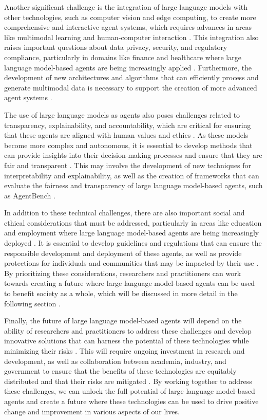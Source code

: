 \documentclass[11pt,a4paper]{article}
\begin{document}
Another significant challenge is the integration of large language models with other technologies, such as computer vision and edge computing, to create more comprehensive and interactive agent systems, which requires advances in areas like multimodal learning and human-computer interaction \cite{doi:10.1109/mwc.005.2400019}. This integration also raises important questions about data privacy, security, and regulatory compliance, particularly in domains like finance and healthcare where large language model-based agents are being increasingly applied \cite{arxiv:2408.06361}. Furthermore, the development of new architectures and algorithms that can efficiently process and generate multimodal data is necessary to support the creation of more advanced agent systems \cite{arxiv:2401.13601}.

The use of large language models as agents also poses challenges related to transparency, explainability, and accountability, which are critical for ensuring that these agents are aligned with human values and ethics \cite{doi:10.1145/3748302}. As these models become more complex and autonomous, it is essential to develop methods that can provide insights into their decision-making processes and ensure that they are fair and transparent \cite{doi:10.18653/v1/2023.acl-long.411}. This may involve the development of new techniques for interpretability and explainability, as well as the creation of frameworks that can evaluate the fairness and transparency of large language model-based agents, such as AgentBench \cite{arxiv:2308.03688}.

In addition to these technical challenges, there are also important social and ethical considerations that must be addressed, particularly in areas like education and employment where large language model-based agents are being increasingly deployed \cite{doi:10.1145/3712003}. It is essential to develop guidelines and regulations that can ensure the responsible development and deployment of these agents, as well as provide protections for individuals and communities that may be impacted by their use \cite{doi:10.1109/mnet.2025.3539338}. By prioritizing these considerations, researchers and practitioners can work towards creating a future where large language model-based agents can be used to benefit society as a whole, which will be discussed in more detail in the following section \cite{doi:10.34133/research.0655}.

Finally, the future of large language model-based agents will depend on the ability of researchers and practitioners to address these challenges and develop innovative solutions that can harness the potential of these technologies while minimizing their risks \cite{arxiv:2408.15769}. This will require ongoing investment in research and development, as well as collaboration between academia, industry, and government to ensure that the benefits of these technologies are equitably distributed and that their risks are mitigated \cite{arxiv:2402.12914}. By working together to address these challenges, we can unlock the full potential of large language model-based agents and create a future where these technologies can be used to drive positive change and improvement in various aspects of our lives.
\end{document}
